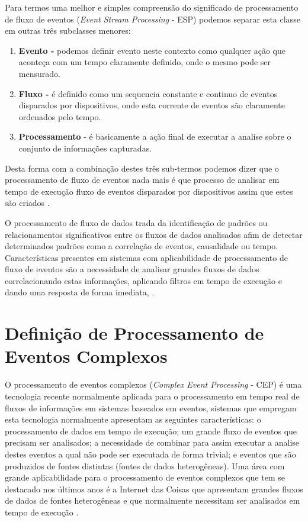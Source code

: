 \documentclass[tid,table]{texufpel} %
\begin{document}
Para termos uma melhor e simples compreensão do significado de processamento de fluxo de eventos (\textit{Event Stream Processing} - ESP) podemos separar esta classe em outras três subclasses menores:
\begin{enumerate}
\item  \textbf{Evento -} podemos definir evento neste contexto como qualquer ação que aconteça com um tempo claramente definido, onde o mesmo pode ser mensurado.  

\item  \textbf{Fluxo -} é definido como um sequencia constante e continuo de eventos disparados por dispositivos, onde esta corrente de eventos são claramente ordenados pelo tempo.

\item  \textbf{Processamento} - é basicamente a ação final de executar a analise sobre o conjunto de informações capturadas.
\end{enumerate}
Desta forma com a combinação destes três sub-termos podemos dizer que o processamento de fluxo de eventos nada mais é que processo de analisar em tempo de execução fluxo de eventos disparados por dispositivos assim que estes são criados \cite{dayarathna2018recent}. 

O processamento de fluxo de dados trada da identificação de padrões ou relacionamentos significativos entre os fluxos de dados analisados afim de detectar determinados padrões como a correlação de eventos, causalidade ou tempo.
Características presentes em sistemas com aplicabilidade de processamento de fluxo de eventos são a necessidade de analisar grandes fluxos de dados correlacionando estas informações, aplicando filtros em tempo de execução e dando uma resposta de forma imediata, \cite{appel2013event}.


\section{Definição de Processamento de Eventos Complexos}
O processamento de eventos complexos (\textit{Complex Event Processing} - CEP) é uma tecnologia recente normalmente aplicada para o processamento em tempo real de fluxos de informações em sistemas baseados em eventos, sistemas que empregam esta tecnologia normalmente apresentam as seguintes características: o processamento de dados em tempo de execução; um grande fluxo de eventos que precisam ser analisados; a necessidade de combinar para assim executar a analise destes eventos a qual não pode ser executada de forma trivial; e eventos que são produzidos de fontes distintas (fontes de dados heterogêneas). Uma área com grande aplicabilidade para o processamento de eventos complexos que tem se destacado nos últimos anos é a Internet das Coisas que apresentam grandes fluxos de dados de fontes heterogêneas e que normalmente necessitam ser analisados em tempo de execução \cite{jun2014design}. 
\end{document}
